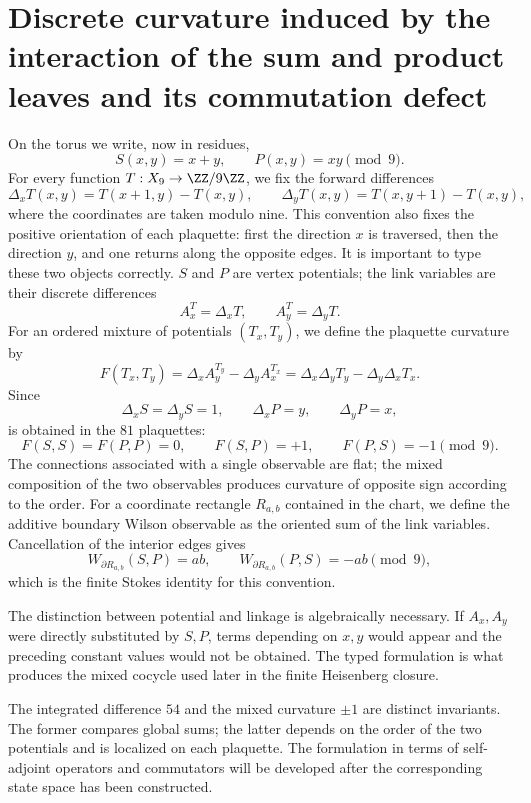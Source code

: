 \section{Discrete curvature induced by the interaction of the sum and product leaves and its commutation defect}

On the torus we write, now in residues,
\[
S(x,y)=x+y,
\qquad
P(x,y)=xy\pmod9.
\]
For every function \(T:X_9\to\ZZ/9\ZZ\), we fix the forward differences
\[
 \Delta_xT(x,y)=T(x+1,y)-T(x,y),\qquad
 \Delta_yT(x,y)=T(x,y+1)-T(x,y),
\]
where the coordinates are taken modulo nine. This convention also fixes the
positive orientation of each plaquette: first the direction
\(x\) is traversed, then the direction \(y\), and one returns along the opposite edges.
It is important to type these two objects correctly. \(S\) and \(P\) are
vertex potentials; the link variables are their discrete
differences
\[
A_x^T=\Delta_xT,
\qquad
A_y^T=\Delta_yT.
\]
For an ordered mixture of potentials \((T_x,T_y)\), we define the
plaquette curvature by
\[
F(T_x,T_y)
=\Delta_x A_y^{T_y}-\Delta_y A_x^{T_x}
=\Delta_x\Delta_yT_y-\Delta_y\Delta_xT_x.
\]
Since
\[
\Delta_xS=\Delta_yS=1,
\qquad
\Delta_xP=y,
\qquad
\Delta_yP=x,
\]
is obtained in the \(81\) plaquettes:
\[
F(S,S)=F(P,P)=0,
\qquad
F(S,P)=+1,
\qquad
F(P,S)=-1\pmod9.
\]
The connections associated with a single observable are flat; the mixed composition of the two observables produces curvature of opposite sign according to the order. For a coordinate rectangle \(R_{a,b}\) contained in the chart, we define the additive boundary Wilson observable as the oriented sum of the link variables. Cancellation of the interior edges gives
\[
 W_{\partial R_{a,b}}(S,P)=ab,\qquad
 W_{\partial R_{a,b}}(P,S)=-ab\pmod9,
\]
which is the finite Stokes identity for this convention.

The distinction between potential and linkage is algebraically necessary. If
\(A_x,A_y\) were directly substituted by \(S,P\), terms depending on
\(x,y\) would appear and the preceding constant values would not be obtained. The typed
formulation is what produces the mixed cocycle used later in the finite
Heisenberg closure.

\begin{remark}
The integrated difference \(54\) and the mixed curvature \(\pm1\) are distinct invariants. The former compares global sums; the latter depends on the order of the two potentials and is localized on each plaquette. The formulation in terms of self-adjoint operators and commutators will be developed after the corresponding state space has been constructed.
\end{remark}

